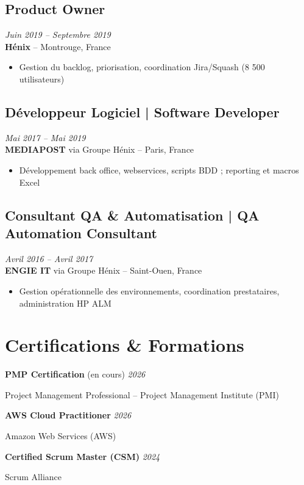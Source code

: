 \documentclass[11pt,a4paper]{article}
\begin{document}
\subsection*{Product Owner} \hfill \textit{Juin 2019 -- Septembre 2019}\\
\textbf{Hénix} -- Montrouge, France
\begin{itemize}
    \item Gestion du backlog, priorisation, coordination Jira/Squash (8 500 utilisateurs)
\end{itemize}

\subsection*{Développeur Logiciel | Software Developer} \hfill \textit{Mai 2017 -- Mai 2019}\\
\textbf{MEDIAPOST} via Groupe Hénix -- Paris, France
\begin{itemize}
    \item Développement back office, webservices, scripts BDD ; reporting et macros Excel
\end{itemize}

\subsection*{Consultant QA \& Automatisation | QA Automation Consultant} \hfill \textit{Avril 2016 -- Avril 2017}\\
\textbf{ENGIE IT} via Groupe Hénix -- Saint-Ouen, France
\begin{itemize}
    \item Gestion opérationnelle des environnements, coordination prestataires, administration HP ALM
\end{itemize}

\section*{Certifications \& Formations}

\textbf{PMP Certification} (en cours) \hfill \textit{2026}

Project Management Professional -- Project Management Institute (PMI)

\textbf{AWS Cloud Practitioner} \hfill \textit{2026}

Amazon Web Services (AWS)

\textbf{Certified Scrum Master (CSM)} \hfill \textit{2024}

Scrum Alliance
\end{document}
